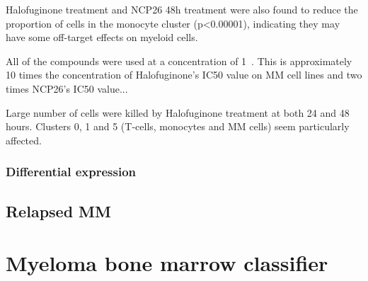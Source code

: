 Halofuginone treatment and NCP26 48h treatment were also found to reduce the proportion of cells in the monocyte cluster (p<0.00001), indicating they may have some off-target effects on myeloid cells.

All of the compounds were used at a concentration of 1\si{\micro\Molar}.
This is approximately 10 times the concentration of Halofuginone's IC50 value on MM cell lines and two times NCP26's IC50 value...

Large number of cells were killed by Halofuginone treatment at both 24 and 48 hours.
Clusters 0, 1 and 5 (T-cells, monocytes and MM cells) seem particularly affected.

\subsubsection{Differential expression}




\subsection{Relapsed MM}


\section{Myeloma bone marrow classifier}